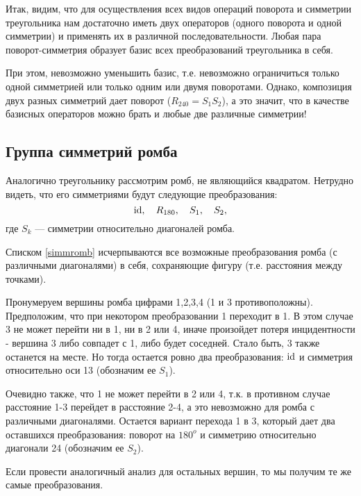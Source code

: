Итак, видим, что для осуществления всех видов операций поворота и симметрии треугольника нам достаточно иметь двух операторов (одного поворота и одной симметрии) и применять их в различной последовательности. Любая пара поворот-симметрия образует базис всех преобразований треугольника в себя.

При этом, невозможно уменьшить базис, т.е. невозможно ограничиться только одной симметрией или только одним или двумя поворотами. Однако, композиция двух разных симметрий дает поворот ($R_{240}=S_1S_2$), а это значит, что в качестве базисных операторов можно брать и любые две различные симметрии!



\subsection{Группа симметрий ромба}

Аналогично треугольнику рассмотрим ромб, не являющийся квадратом. Нетрудно видеть, что его симметриями будут следующие преобразования:
\begin{equation}\label{simmromb}
\mathrm{id},\quad R_{180},\quad S_1,\quad S_2,
\end{equation}
где $S_k$ --- симметрии относительно диагоналей ромба.

\begin{thrm}
Списком \eqref{simmromb} исчерпываются все возможные преобразования ромба (с различными диагоналями) в себя, сохраняющие фигуру (т.е. расстояния между точками).
\end{thrm}
\pf
Пронумеруем вершины ромба цифрами 1,2,3,4 (1 и 3 противоположны). Предположим, что при некотором преобразовании 1 переходит в 1. В этом случае 3 не может перейти ни в 1, ни в 2 или 4, иначе произойдет потеря инцидентности - вершина 3 либо совпадет с 1, либо будет соседней. Стало быть, 3 также останется на месте. Но тогда остается ровно два преобразования: $\mathrm{id}$ и симметрия относительно оси 13 (обозначим ее $S_1$).

Очевидно также, что 1 не может перейти в 2 или 4, т.к. в противном случае расстояние 1-3 перейдет в расстояние 2-4, а это невозможно для ромба с различными диагоналями. Остается вариант перехода 1 в 3, который дает два оставшихся преобразования: поворот на $180^o$ и симметрию относительно диагонали 24 (обозначим ее $S_2$).

Если провести аналогичный анализ для остальных вершин, то мы получим те же самые преобразования.
\epf

